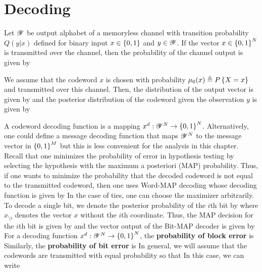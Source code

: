 \documentclass[letterpaper,english,10pt]{article}
\begin{document}
\section{Decoding}
Let $\mathscr{Y}$ be output alphabet of a memoryless channel with transition probability $Q(y|x)$ defined for binary input $x \in \left\{0,1\right\}$ and $y \in  \mathscr{Y}$. 
If the vector $x \in \left\{0,1\right\}^N$ is transmitted over the channel, 
then the probability of the channel output is given by 

We assume that the codeword $x$ is chosen with probability $\mu_0(x) \triangleq P\left\{X = x\right\}$ 
and transmitted over this channel. 
Then, the distribution of the output vector is given by 
and the posterior distribution of the codeword given the observation $y$ is given by 

A codeword decoding function is a mapping $x^d : \mathscr{Y}^N \to \left\{0,1\right\}^N$. 
Alternatively, one could define a message decoding function that maps $\mathscr{Y}^N$ to the message vector in $\left\{0,1\right\}^M$ but this is less convenient for the analysis in this chapter. 
Recall that one minimizes the probability of error in hypothesis testing by selecting the hypothesis with the maximum a posteriori (MAP) probability. 
Thus, if one wants to minimize the probability that the decoded codeword is not equal to the transmitted codeword, then one uses Word-MAP decoding whose decoding function is given by 
In the case of ties, one can choose the maximizer arbitrarily.
To decode a single bit, we denote the posterior probability of the $i$th bit by
where $x_{\setminus i}$ denotes the vector $x$ without the $i$th coordinate. 
Thus, the MAP decision for the $i$th bit is given by
and the vector output of the Bit-MAP decoder is given by
For a decoding function $x^d : \mathscr{Y}^N \to \left\{0,1\right\}^N$, the \textbf{probability of block error} is 
Similarly, the \textbf{probability of bit error} is
In general, we will assume that the codewords are transmitted with equal probability so that
In this case, we can write 
\end{document}
